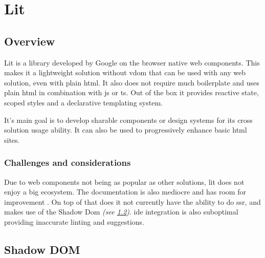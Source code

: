 
\section{Lit}
\label{sec:lit}

\subsection{Overview}
\label{subsec:lit:overview}

Lit is a library developed by Google on the browser native web components. This makes it a lightweight solution without \acrshort{vdom} that can be used with any web solution, even with plain \acrshort{html}. It also does not require much boilerplate and uses plain \acrshort{html} in combination with \acrshort{js} or \acrshort{ts}. Out of the box it provides reactive state, scoped styles and a declarative templating system. \cite{lit:intro}

It's main goal is to develop sharable components or design systems for its cross solution usage ability. It can also be used to progressively enhance basic \acrshort{html} sites.

\subsubsection{Challenges and considerations}

Due to web components not being as popular as other solutions, lit does not enjoy a big ecosystem. The documentation is also mediocre and has room for improvement \cite{github:issue_lit}. On top of that does it not currently have the ability to do \acrshort{ssr}, and makes use of the Shadow Dom \textit{(see \ref{subsec:lit:shadow_dom})}. \acrshort{ide} integration is also suboptimal providing inaccurate linting and suggestions. \cite{lit:ssr, designsystemcentral:web_components, mitosis:overview}

\subsection{Shadow DOM}
\label{subsec:lit:shadow_dom}

